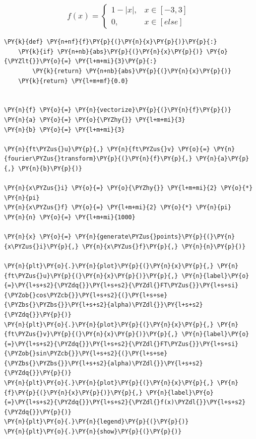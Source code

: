     \hypertarget{fx-begincases-1--x-x-in--3-3-0-x-in-else-endcases}{%
\subsubsection{\texorpdfstring{\[f(x) = \begin{cases} 1 -|x|, & x \in [-3, 3] \\ 0, & x \in [else] \end{cases}\]}{f(x) = \textbackslash begin\{cases\} 1 -\textbar x\textbar, \& x \textbackslash in {[}-3, 3{]} \textbackslash\textbackslash{} 0, \& x \textbackslash in {[}else{]} \textbackslash end\{cases\}}}\label{fx-begincases-1--x-x-in--3-3-0-x-in-else-endcases}}

    \begin{tcolorbox}[breakable, size=fbox, boxrule=1pt, pad at break*=1mm,colback=cellbackground, colframe=cellborder]
\begin{Verbatim}[commandchars=\\\{\}]
\PY{k}{def} \PY{n+nf}{f}\PY{p}{(}\PY{n}{x}\PY{p}{)}\PY{p}{:}
    \PY{k}{if} \PY{n+nb}{abs}\PY{p}{(}\PY{n}{x}\PY{p}{)} \PY{o}{\PYZlt{}}\PY{o}{=} \PY{l+m+mi}{3}\PY{p}{:}
        \PY{k}{return} \PY{n+nb}{abs}\PY{p}{(}\PY{n}{x}\PY{p}{)}
    \PY{k}{return} \PY{l+m+mf}{0.0}


\PY{n}{f} \PY{o}{=} \PY{n}{vectorize}\PY{p}{(}\PY{n}{f}\PY{p}{)}
\PY{n}{a} \PY{o}{=} \PY{o}{\PYZhy{}} \PY{l+m+mi}{3}
\PY{n}{b} \PY{o}{=} \PY{l+m+mi}{3}

\PY{n}{ft\PYZus{}u}\PY{p}{,} \PY{n}{ft\PYZus{}v} \PY{o}{=} \PY{n}{fourier\PYZus{}transform}\PY{p}{(}\PY{n}{f}\PY{p}{,} \PY{n}{a}\PY{p}{,} \PY{n}{b}\PY{p}{)}

\PY{n}{x\PYZus{}i} \PY{o}{=} \PY{o}{\PYZhy{}} \PY{l+m+mi}{2} \PY{o}{*} \PY{n}{pi}
\PY{n}{x\PYZus{}f} \PY{o}{=} \PY{l+m+mi}{2} \PY{o}{*} \PY{n}{pi}
\PY{n}{n} \PY{o}{=} \PY{l+m+mi}{1000}

\PY{n}{x} \PY{o}{=} \PY{n}{generate\PYZus{}points}\PY{p}{(}\PY{n}{x\PYZus{}i}\PY{p}{,} \PY{n}{x\PYZus{}f}\PY{p}{,} \PY{n}{n}\PY{p}{)}

\PY{n}{plt}\PY{o}{.}\PY{n}{plot}\PY{p}{(}\PY{n}{x}\PY{p}{,} \PY{n}{ft\PYZus{}u}\PY{p}{(}\PY{n}{x}\PY{p}{)}\PY{p}{,} \PY{n}{label}\PY{o}{=}\PY{l+s+s2}{\PYZdq{}}\PY{l+s+s2}{\PYZdl{}FT\PYZus{}}\PY{l+s+si}{\PYZob{}cos\PYZcb{}}\PY{l+s+s2}{(}\PY{l+s+se}{\PYZbs{}\PYZbs{}}\PY{l+s+s2}{alpha)\PYZdl{}}\PY{l+s+s2}{\PYZdq{}}\PY{p}{)}
\PY{n}{plt}\PY{o}{.}\PY{n}{plot}\PY{p}{(}\PY{n}{x}\PY{p}{,} \PY{n}{ft\PYZus{}v}\PY{p}{(}\PY{n}{x}\PY{p}{)}\PY{p}{,} \PY{n}{label}\PY{o}{=}\PY{l+s+s2}{\PYZdq{}}\PY{l+s+s2}{\PYZdl{}FT\PYZus{}}\PY{l+s+si}{\PYZob{}sin\PYZcb{}}\PY{l+s+s2}{(}\PY{l+s+se}{\PYZbs{}\PYZbs{}}\PY{l+s+s2}{alpha)\PYZdl{}}\PY{l+s+s2}{\PYZdq{}}\PY{p}{)}
\PY{n}{plt}\PY{o}{.}\PY{n}{plot}\PY{p}{(}\PY{n}{x}\PY{p}{,} \PY{n}{f}\PY{p}{(}\PY{n}{x}\PY{p}{)}\PY{p}{,} \PY{n}{label}\PY{o}{=}\PY{l+s+s2}{\PYZdq{}}\PY{l+s+s2}{\PYZdl{}f(x)\PYZdl{}}\PY{l+s+s2}{\PYZdq{}}\PY{p}{)}
\PY{n}{plt}\PY{o}{.}\PY{n}{legend}\PY{p}{(}\PY{p}{)}
\PY{n}{plt}\PY{o}{.}\PY{n}{show}\PY{p}{(}\PY{p}{)}
\end{Verbatim}
\end{tcolorbox}

